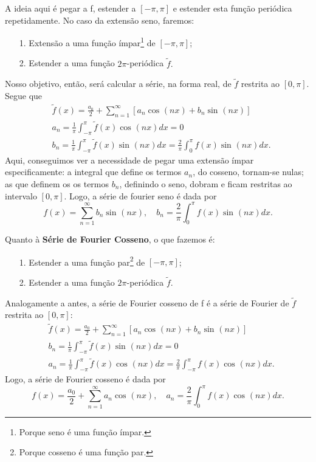 \documentclass[../pde_notes.tex]{subfiles}
\begin{document}
A ideia aqui é pegar a f, estender a \([-\pi ,\pi ]\) e estender esta função periódica repetidamente. No caso da extensão seno, faremos:
\begin{itemize}
	\item[1.] Extensão a uma função ímpar\footnote{Porque seno é uma função ímpar.} de \([-\pi , \pi ]\);
	\item[2.] Estender a uma função \(2\pi \)-periódica \(\tilde{f}.\)
\end{itemize}
Nosso objetivo, então, será calcular a série, na forma real, de \(\tilde{f}\) restrita ao \([0, \pi ]\). Segue que
\begin{align*}
	 & \tilde{f}(x) = \frac{a_{0}}{2} + \sum\limits_{n=1}^{\infty}[a_{n}\cos^{}{(nx)} + b_{n}\sin^{}{(nx)}]                     \\
	 & a_{n} = \frac{1}{\pi }\int_{-\pi }^{\pi }\tilde{f}(x)\cos^{}{(nx)}dx = 0                                                 \\
	 & b_{n} = \frac{1}{\pi }\int_{-\pi }^{\pi }\tilde{f}(x)\sin^{}{(nx)}dx = \frac{2}{\pi }\int_{0}^{\pi }f(x)\sin^{}{(nx)}dx.
\end{align*}
Aqui, conseguimos ver a necessidade de pegar uma extensão ímpar especificamente: a integral que define os termos \(a_{n}\), do cosseno, tornam-se nulas; as que definem os os termos \(b_{n}\), definindo o seno, dobram e ficam restritas ao intervalo \([0, \pi ]\). Logo, a série de fourier seno é dada por
\[
	f(x)=\sum\limits_{n=1}^{\infty}b_{n}\sin^{}{(nx)},\quad b_{n} = \frac{2}{\pi }\int_{0}^{\pi }f(x)\sin^{}{(nx)}dx.
\]

Quanto à \textbf{Série de Fourier Cosseno}, o que fazemos é:
\begin{itemize}
	\item[1.] Estender a uma função par\footnote{Porque cosseno é uma função par.} de \([-\pi , \pi ]\);
	\item[2.] Estender a uma função \(2\pi \)-periódica \(\tilde{f}.\)
\end{itemize}
Analogamente a antes, a série de Fourier cosseno de f é a série de Fourier de \(\tilde{f}\) restrita ao \([0, \pi ]\):
\begin{align*}
	 & \tilde{f}(x) = \frac{a_{0}}{2} + \sum\limits_{n=1}^{\infty}[a_{n}\cos^{}{(nx)} + b_{n}\sin^{}{(nx)}]                         \\
	 & b_{n} = \frac{1}{\pi }\int_{-\pi }^{\pi }\tilde{f}(x)\sin^{}{(nx)}dx = 0                                                     \\
	 & a_{n} = \frac{1}{\pi }\int_{-\pi }^{\pi }\tilde{f}(x)\cos^{}{(nx)}dx = \frac{2}{\pi }\int_{-\pi }^{\pi }f(x)\cos^{}{(nx)}dx.
\end{align*}
Logo, a série de Fourier cosseno é dada por
\[
	f(x)=\frac{a_{0}}{2} + \sum\limits_{n=1}^{\infty}a_{n}\cos^{}{(nx)},\quad a_{n}=\frac{2}{\pi }\int_{0}^{\pi }f(x)\cos^{}{(nx)}dx.
\]
\end{document}
